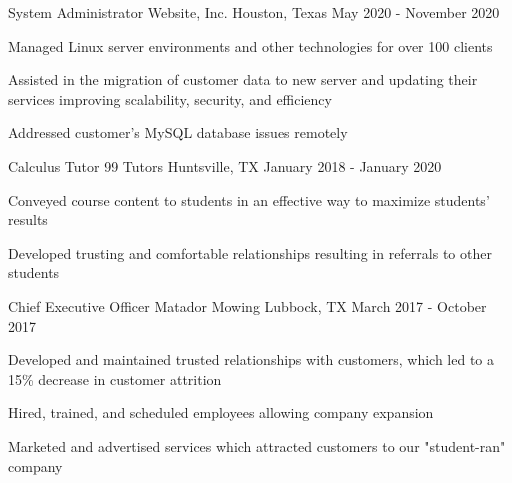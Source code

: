     \begin{cventries}

          \cventry
            {System Administrator} %
            {Website, Inc.} %
            {Houston, Texas} %
            {May 2020 - November 2020} %
            {
              \begin{cvitems} %
                \item {Managed Linux server environments and other technologies for over 100 clients}
                \item {Assisted in the migration of customer data to new server and updating their services improving scalability, security, and efficiency}
                \item {Addressed customer's MySQL database issues remotely }
              \end{cvitems}
            }

          \cventry
            {Calculus Tutor} 		%
            {99 Tutors} 			%
            {Huntsville, TX} %
            {January 2018 - January 2020} %
            {
              \begin{cvitems} %
                \item {Conveyed course content to students in an effective way to maximize students' results}
                \item {Developed trusting and comfortable relationships resulting in referrals to other students}
              \end{cvitems}
            }

          \cventry
            {Chief Executive Officer} %
            {Matador Mowing} %
            {Lubbock, TX} %
            {March 2017 - October 2017} %
            {
              \begin{cvitems} %
                \item {Developed and maintained trusted relationships with customers, which led to a 15\% decrease in customer attrition}
                \item {Hired, trained, and scheduled employees allowing company expansion}
               \item {Marketed and advertised services which attracted customers to our "student-ran" company}
              \end{cvitems}
            }


\end{cventries}
